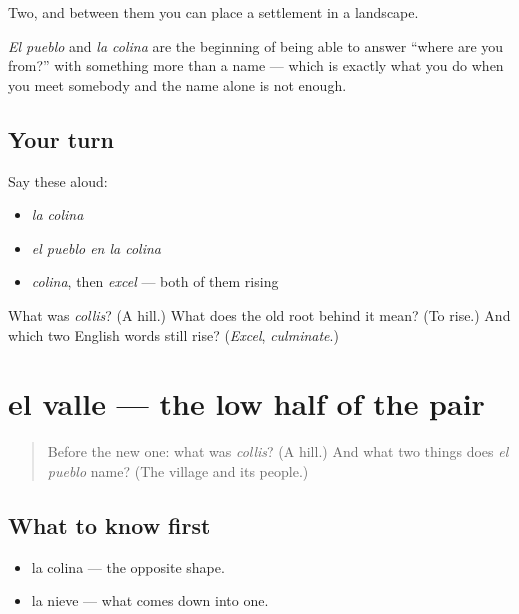 \begin{grammarlens}[title={What you've built}]
Two, and between them you can place a settlement in a landscape.

\emph{El pueblo} and \emph{la colina} are the beginning of being able to answer \textquotedblleft{}where are you from?\textquotedblright{} with something more than a name — which is exactly what you do when you meet somebody and the name alone is not enough.
\end{grammarlens}

\subsection*{Your turn}
Say these aloud:

\begin{itemize}
\raggedright
  \item \emph{la colina}
  \item \emph{el pueblo en la colina}
  \item \emph{colina}, then \emph{excel} — both of them rising
\end{itemize}

\begin{tcolorbox}[breakable,colback=teal!4,colframe=teal!35!black,title={Before you move on}]
What was \emph{collis}? (A hill.) What does the old root behind it mean? (To rise.) And which two English words still rise? (\emph{Excel}, \emph{culminate}.)
\end{tcolorbox}
\section[el valle]{el valle — the low half of the pair}

\label{lesson:ES-C292-valle}



\begin{quote}
Before the new one: what was \emph{collis}? (A hill.) And what two things does \emph{el pueblo} name? (The village and its people.)
\end{quote}

\subsection*{What to know first}
\begin{itemize}
\raggedright
  \item la colina — the opposite shape.
  \item la nieve — what comes down into one.
\end{itemize}

